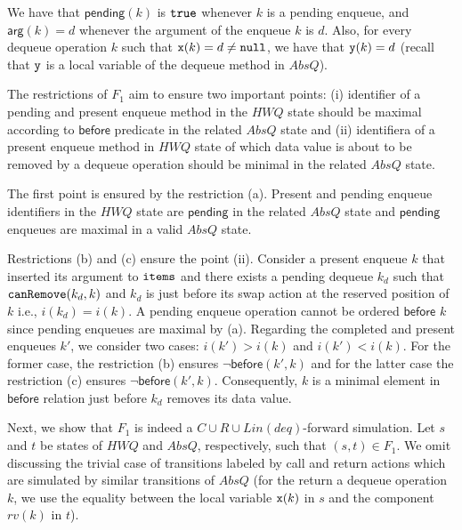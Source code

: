 \noindent
We have that $\mathsf{pending}(k)$ is ${\tt true}$ whenever $k$ is a pending enqueue, and $\mathsf{arg}(k)=d$ whenever the argument of the enqueue $k$ is $d$. 
Also, for every dequeue operation $k$ such that ${\tt x}(k)=d\neq {\tt null}$, we have that ${\tt y}(k)=d$ (recall that ${\tt y}$ is a local variable of the dequeue method in $AbsQ$).

The restrictions of $F_1$ aim to ensure two important points:  (i) identifier of a pending and present enqueue method in the $\mathit{HWQ}$ state should be maximal according to $\mathsf{before}$ predicate in the related $AbsQ$ state and (ii) identifiera of a present enqueue method in $\mathit{HWQ}$ state of which data value is about to be removed by a dequeue operation should be minimal in the related $AbsQ$ state.

The first point is ensured by the restriction (a). Present and pending enqueue identifiers in the $\mathit{HWQ}$ state are $\mathsf{pending}$ in the related $AbsQ$ state and $\mathsf{pending}$ enqueues are maximal in a valid $AbsQ$ state.

Restrictions (b) and (c) ensure the point (ii). Consider a present enqueue $k$ that inserted its argument to ${\tt items}$ and  there exists a pending dequeue $k_d$ such that ${\tt canRemove}(k_d, k)$ and $k_d$ is just before its swap action at the reserved position of $k$ i.e., $i(k_d) = i(k)$. A pending enqueue operation cannot be ordered $\mathsf{before}$ $k$ since pending enqueues are maximal by (a). Regarding the completed and present enqueues $k'$, we consider two cases: $i(k') > i(k)$ and $i(k') < i(k)$. For the former case, the restriction (b) ensures $\neg \mathsf{before}(k',k)$ and for the latter case the restriction (c) ensures $\neg \mathsf{before}(k',k)$. Consequently, $k$ is a minimal element in $\mathsf{before}$ relation just before $k_d$ removes its data value.

Next, we show that $F_1$ is indeed a $C\cup R\cup Lin(deq)$-forward simulation. Let $s$ and $t$ be states of $\mathit{HWQ}$ and $AbsQ$, respectively, such that $(s,t)\in F_1$. 
We omit discussing the trivial case of transitions labeled by call and return actions which are simulated by similar transitions of $AbsQ$ (for the return a dequeue operation $k$, we use the equality between the local variable ${\tt x}(k)$ in $s$ and the component $rv(k)$ in $t$). 

